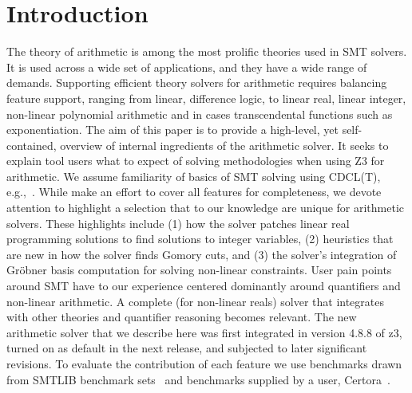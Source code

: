 
\section{Introduction}

The theory of arithmetic
is among the most prolific theories used in SMT solvers. It is used across a wide set of
applications, and they have a wide range of demands.
Supporting efficient theory solvers for arithmetic requires balancing feature support,
ranging from linear, difference logic, to linear real, linear integer, non-linear polynomial arithmetic
and in cases transcendental functions such as exponentiation.
The aim of this paper is to provide a high-level, yet self-contained, overview of internal ingredients of the arithmetic solver.
It seeks to explain tool users what to expect of solving methodologies when using Z3 for arithmetic.
We assume familiarity of basics of SMT solving using CDCL(T), e.g.,~\cite{z3internals}.
While make an effort to cover all features for completeness,
we devote attention to highlight a selection that to our knowledge are unique for arithmetic solvers.
These highlights include
(1) how the solver patches linear real programming solutions to find solutions to integer variables,
(2) heuristics that are new in how the solver finds Gomory cuts, and
(3) the solver's integration of Gr{\"o}bner basis computation for solving non-linear constraints.
User pain points around SMT have to our experience centered dominantly
around quantifiers and non-linear arithmetic. A complete (for non-linear reals) solver that integrates
with other theories and quantifier reasoning becomes relevant. The new arithmetic solver that we describe here
was first integrated in version 4.8.8 of z3, turned on as default in the next release,
and subjected to later significant revisions.
To evaluate the contribution of each feature we use benchmarks drawn
from SMTLIB benchmark sets~\cite{SMTLIB2} and benchmarks supplied by a user, 
Certora~\cite{bench-submission}.

